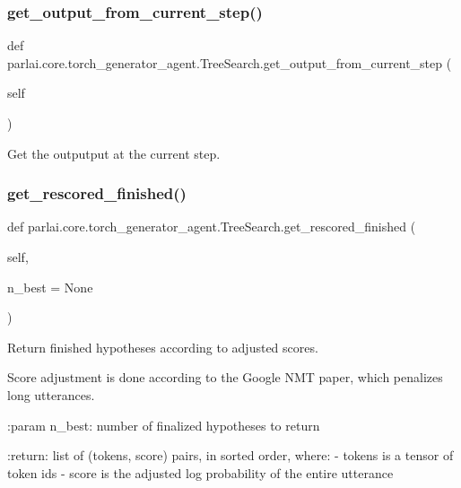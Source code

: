 \subsubsection{\texorpdfstring{get\+\_\+output\+\_\+from\+\_\+current\+\_\+step()}{get\_output\_from\_current\_step()}}
{\footnotesize\ttfamily def parlai.\+core.\+torch\+\_\+generator\+\_\+agent.\+Tree\+Search.\+get\+\_\+output\+\_\+from\+\_\+current\+\_\+step (\begin{DoxyParamCaption}\item[{}]{self }\end{DoxyParamCaption})}

\begin{DoxyVerb}Get the outputput at the current step.
\end{DoxyVerb}
 \mbox{\label{classparlai_1_1core_1_1torch__generator__agent_1_1TreeSearch_a4b70f85eec7d81b3a0e1afaea5b09332}} 
\subsubsection{\texorpdfstring{get\+\_\+rescored\+\_\+finished()}{get\_rescored\_finished()}}
{\footnotesize\ttfamily def parlai.\+core.\+torch\+\_\+generator\+\_\+agent.\+Tree\+Search.\+get\+\_\+rescored\+\_\+finished (\begin{DoxyParamCaption}\item[{}]{self,  }\item[{}]{n\+\_\+best = {\ttfamily None} }\end{DoxyParamCaption})}

\begin{DoxyVerb}Return finished hypotheses according to adjusted scores.

Score adjustment is done according to the Google NMT paper, which
penalizes long utterances.

:param n_best:
    number of finalized hypotheses to return

:return:
    list of (tokens, score) pairs, in sorted order, where:
      - tokens is a tensor of token ids
      - score is the adjusted log probability of the entire utterance
\end{DoxyVerb}
 \mbox{\label{classparlai_1_1core_1_1torch__generator__agent_1_1TreeSearch_a35a3cbfe2df2d02bb46f7e492657afa5}} 
